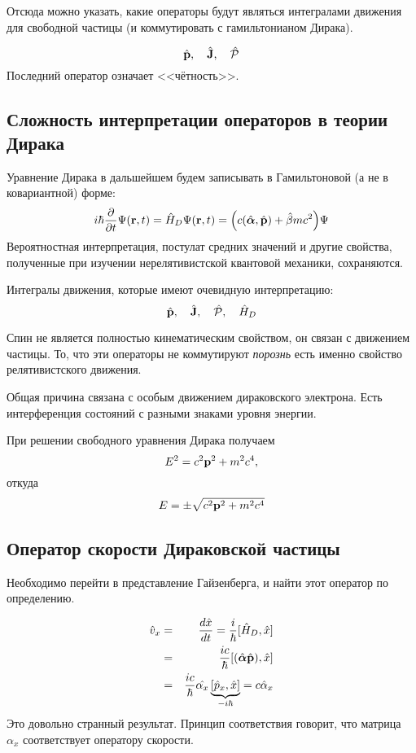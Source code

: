 Отсюда можно указать, какие операторы будут являться интегралами движения для свободной частицы (и коммутировать с гамильтонианом Дирака).

$$
    \hat{\bf p}, \quad \hat {\bf J}, \quad \hat{\mathcal P}
$$ 
Последний оператор означает <<чётность>>.

\subsection{Сложность интерпретации операторов в теории Дирака}
Уравнение Дирака в дальшейшем будем записывать в Гамильтоновой (а не в ковариантной) форме:
$$
    i \hbar \dfrac{\pd}{\pd t} \Psi(\bf r, t) = \hat H_D \Psi(\bf r, t) = 
    \Big(
        c (\hat{\boldsymbol \alpha}, \hat{\bf p}) + \hat \beta mc^2
    \Big)\Psi
$$
Вероятностная интерпретация, постулат средних значений и другие свойства, полученные при изучении нерелятивистской квантовой механики, сохраняются.

Интегралы движения, которые имеют очевидную интерпретацию:
$$
    \hat {\bf p}, \quad \hat{\bf J}, \quad \hat{\mathcal P}, \quad \Hat{H}_D
$$ 


Спин не является полностью кинематическим свойством, он связан с движением частицы. То, что эти операторы не коммутируют \emph{порознь} есть именно свойство релятивистского движения.

Общая причина связана с особым движением дираковского электрона. Есть интерференция состояний с разными знаками уровня энергии.

При решении свободного уравнения Дирака получаем
$$
    E^2 = c^2 \bf p^2 + m^2 c^4,
$$ 
откуда
$$
    E = \pm \sqrt{c^2 \bf p^2 + m^2 c^4}
$$
\subsection{Оператор скорости Дираковской частицы}
Необходимо перейти в представление Гайзенберга, и найти этот оператор по определению.

\begin{eqnarray*}
    \hat v_x &=& \dfrac{d \hat x}{dt} = \dfrac{i}{\hbar} [\hat H_D, \hat x]\\&=&
    \dfrac{ic}{\hbar} [(\hat {\boldsymbol \alpha} \hat{\bf p}), \hat x]\\
    &=& \dfrac{ic}{\hbar} \hat{\alpha_x} \underbrace{[\hat p_x, \hat x]}_{-i \hbar} = c \hat \alpha_x
\end{eqnarray*}
Это довольно странный результат. Принцип соответствия говорит, что матрица $\alpha_x$ соответствует оператору скорости.

